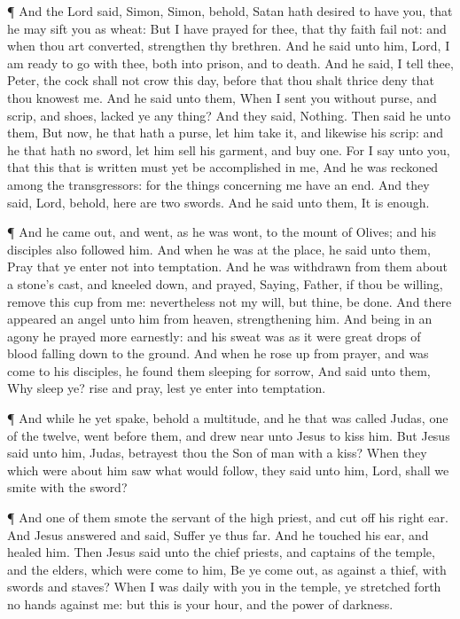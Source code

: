  ¶ And the Lord said, Simon, Simon, behold, Satan hath
desired to have you, that he may sift you as wheat:  But I
have prayed for thee, that thy faith fail not: and when thou art
converted, strengthen thy brethren.  And he said unto him,
Lord, I am ready to go with thee, both into prison, and to death.
 And he said, I tell thee, Peter, the cock shall not crow
this day, before that thou shalt thrice deny that thou knowest me.
 And he said unto them, When I sent you without purse, and
scrip, and shoes, lacked ye any thing? And they said, Nothing.
 Then said he unto them, But now, he that hath a purse, let
him take it, and likewise his scrip: and he that hath no sword, let him
sell his garment, and buy one.  For I say unto you, that
this that is written must yet be accomplished in me, And he was reckoned
among the transgressors: for the things concerning me have an end.
 And they said, Lord, behold, here are two swords. And he
said unto them, It is enough.

 ¶ And he came out, and went, as he was wont, to the mount
of Olives; and his disciples also followed him.  And when
he was at the place, he said unto them, Pray that ye enter not into
temptation.  And he was withdrawn from them about a stone's
cast, and kneeled down, and prayed,  Saying, Father, if
thou be willing, remove this cup from me: nevertheless not my will, but
thine, be done.  And there appeared an angel unto him from
heaven, strengthening him.  And being in an agony he prayed
more earnestly: and his sweat was as it were great drops of blood
falling down to the ground.  And when he rose up from
prayer, and was come to his disciples, he found them sleeping for
sorrow,  And said unto them, Why sleep ye? rise and pray,
lest ye enter into temptation.

 ¶ And while he yet spake, behold a multitude, and he that
was called Judas, one of the twelve, went before them, and drew near
unto Jesus to kiss him.  But Jesus said unto him, Judas,
betrayest thou the Son of man with a kiss?  When they which
were about him saw what would follow, they said unto him, Lord, shall we
smite with the sword?

 ¶ And one of them smote the servant of the high priest,
and cut off his right ear.  And Jesus answered and said,
Suffer ye thus far. And he touched his ear, and healed him.
 Then Jesus said unto the chief priests, and captains of
the temple, and the elders, which were come to him, Be ye come out, as
against a thief, with swords and staves?  When I was daily
with you in the temple, ye stretched forth no hands against me: but this
is your hour, and the power of darkness.

